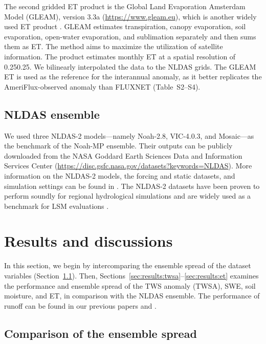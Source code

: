 \documentclass[essd, manuscript]{copernicus}
\begin{document}
The second gridded ET product is the Global Land Evaporation Amsterdam Model (GLEAM), version 3.3a (\url{https://www.gleam.eu}), which is another widely used ET product \citep{xu2019JHa}. GLEAM estimates transpiration, canopy evaporation, soil evaporation, open-water evaporation, and sublimation separately and then sums them as ET\@. The method aims to maximize the utilization of satellite information. The product estimates monthly ET at a spatial resolution of 0.25\degree{}\times{}0.25\degree{}. We bilinearly interpolated the data to the NLDAS grids. The GLEAM ET is used as the reference for the interannual anomaly, as it better replicates the AmeriFlux-observed anomaly than FLUXNET (Table~S2--S4).

\subsection{NLDAS ensemble}\label{sec:methods:nldas}

We used three NLDAS-2 models---namely Noah-2.8, VIC-4.0.3, and Mosaic---as the benchmark of the Noah-MP ensemble. Their outputs can be publicly downloaded from the NASA Goddard Earth Sciences Data and Information Services Center (\url{https://disc.gsfc.nasa.gov/datasets?keywords=NLDAS}). More information on the NLDAS-2 models, the forcing and static datasets, and simulation settings can be found in \citet{xia2012JGRA, xia2012JGRAa}. The NLDAS-2 datasets have been proven to perform soundly for regional hydrological simulations \citep{xia2012JGRA, xia2012JGRAa, xia2016JGRA, xia2015JHa, xia2015JH} and are widely used as a benchmark for LSM evaluations \citep{cai2014JGRAa, fei2021WRR}.

\section{Results and discussions}\label{sec:results}

In this section, we begin by intercomparing the ensemble spread of the dataset variables (Section~\ref{sec:results:spread}). Then, Sections~\ref{sec:results:twsa}--\ref{sec:results:et} examines the performance and ensemble spread of the TWS anomaly (TWSA), SWE, soil moisture, and ET, in comparison with the NLDAS ensemble. The performance of runoff can be found in our previous papers \citet{fei2021WRR} and \citet{zheng2020JAMES}.

\subsection{Comparison of the ensemble spread}\label{sec:results:spread}
\end{document}
